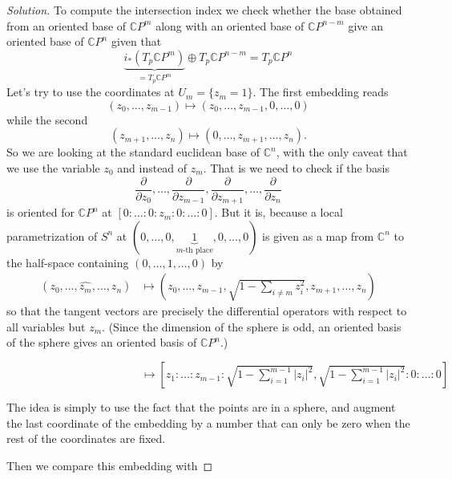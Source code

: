 \begin{proof}[Solution]
To compute the intersection index we check whether the base obtained from an oriented base of \(\mathbb{C}P^{m}\) along with an oriented base of \(\mathbb{C}P^{n-m}\) give an oriented base of \(\mathbb{C}P^{n}\) given that
\[\underbrace{i_*(T_p \mathbb{C}P^{m})}_{=T_p\mathbb{C}P^m}\oplus T_p\mathbb{C}P^{n-m}=T_p\mathbb{C}P^{n}\]
Let's try to use the coordinates at \(U_m=\{z_m=1\}\). The first embedding reads
\[(z_0,\ldots,z_{m-1})\mapsto (z_0,\ldots,z_{m-1},0,\ldots,0)\]
while the second
\[(z_{m+1},\ldots,z_n)\mapsto (0,\ldots,z_{m+1},\ldots,z_n).\]
So we are looking at the standard euclidean base of \(\mathbb{C}^n\), with the only caveat that we use the variable \(z_0\) and instead of \(z_m\). That is we need to check if the basis
\[\frac{\partial }{\partial z_0},\ldots,\frac{\partial }{\partial z_{m-1}},\frac{\partial }{\partial z_{m+1}},\ldots,\frac{\partial }{\partial z_n}\]
is oriented for \(\mathbb{C}P^{n}\) at \([0:\ldots:0:z_m:0:\ldots:0]\). But it is, because a local parametrization of \(S^{n}\) at \((0,\ldots,0,\underbrace{1}_{m\text{-th place} },0,\ldots,0)\) is given as a map from \(\mathbb{C}^n\) to the half-space containing \((0,\ldots,1,\ldots,0)\) by
\begin{align*}
	(z_0,\ldots,\widehat{z_m},\ldots,z_n) &\longmapsto \left(z_0,\ldots,z_{m-1},\sqrt{1-\sum_{i\neq m}z_i^2} ,z_{m+1},\ldots,z_n\right) 
\end{align*}
so that the tangent vectors are precisely the differential operators with respect to all variables but \(z_m\). (Since the dimension of the sphere is odd, an oriented basis of the sphere gives an oriented basis of  \(\mathbb{C}P^{n}\).)


\(\qquad \qquad \qquad \qquad \qquad \qquad  \longmapsto \left[z_1:\ldots:z_{m-1}:\sqrt{1-\sum_{i=1}^{m-1}|z_i|^2},\sqrt{1-\sum_{i=1}^{m-1}|z_i|^2}:0:\ldots:0\right] \)

The idea is simply to use the fact that the points are in a sphere, and augment the last coordinate of the embedding by a number that can only be zero when the rest of the coordinates are fixed.

Then we compare this embedding with\fi
\end{proof}

